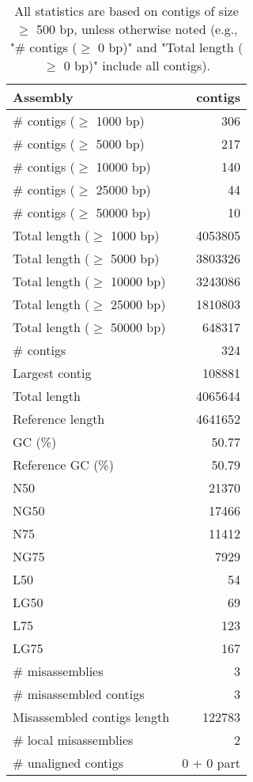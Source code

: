 \documentclass[12pt,a4paper]{article}
\begin{document}
\begin{table}[ht]
\begin{center}
\caption{All statistics are based on contigs of size $\geq$ 500 bp, unless otherwise noted (e.g., "\# contigs ($\geq$ 0 bp)" and "Total length ($\geq$ 0 bp)" include all contigs).}
\begin{tabular}{|l*{1}{|r}|}
\hline
Assembly & contigs \\ \hline
\# contigs ($\geq$ 1000 bp) & 306 \\ \hline
\# contigs ($\geq$ 5000 bp) & 217 \\ \hline
\# contigs ($\geq$ 10000 bp) & 140 \\ \hline
\# contigs ($\geq$ 25000 bp) & 44 \\ \hline
\# contigs ($\geq$ 50000 bp) & 10 \\ \hline
Total length ($\geq$ 1000 bp) & 4053805 \\ \hline
Total length ($\geq$ 5000 bp) & 3803326 \\ \hline
Total length ($\geq$ 10000 bp) & 3243086 \\ \hline
Total length ($\geq$ 25000 bp) & 1810803 \\ \hline
Total length ($\geq$ 50000 bp) & 648317 \\ \hline
\# contigs & 324 \\ \hline
Largest contig & 108881 \\ \hline
Total length & 4065644 \\ \hline
Reference length & 4641652 \\ \hline
GC (\%) & 50.77 \\ \hline
Reference GC (\%) & 50.79 \\ \hline
N50 & 21370 \\ \hline
NG50 & 17466 \\ \hline
N75 & 11412 \\ \hline
NG75 & 7929 \\ \hline
L50 & 54 \\ \hline
LG50 & 69 \\ \hline
L75 & 123 \\ \hline
LG75 & 167 \\ \hline
\# misassemblies & 3 \\ \hline
\# misassembled contigs & 3 \\ \hline
Misassembled contigs length & 122783 \\ \hline
\# local misassemblies & 2 \\ \hline
\# unaligned contigs & 0 + 0 part \\ \hline

\end{tabular}
\end{center}
\end{table}
\end{document}
